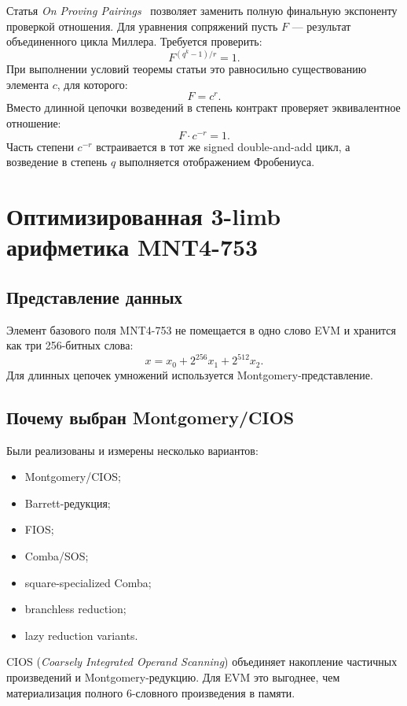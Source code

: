 \documentclass[12pt,a4paper]{article}
\begin{document}
Статья \emph{On Proving Pairings}~\cite{eprint640} позволяет заменить полную
финальную экспоненту проверкой отношения. Для уравнения сопряжений пусть $F$ ---
результат объединенного цикла Миллера. Требуется проверить:
\[
    F^{(q^k-1)/r}=1.
\]
При выполнении условий теоремы статьи это равносильно существованию элемента
$c$, для которого:
\[
    F=c^r.
\]
Вместо длинной цепочки возведений в степень контракт проверяет эквивалентное
отношение:
\[
    F\cdot c^{-r}=1.
\]
Часть степени $c^{-r}$ встраивается в тот же signed double-and-add цикл, а
возведение в степень $q$ выполняется отображением Фробениуса.

\section{Оптимизированная 3-limb арифметика MNT4-753}

\subsection{Представление данных}

Элемент базового поля MNT4-753 не помещается в одно слово EVM и хранится как
три 256-битных слова:
\[
    x=x_0+2^{256}x_1+2^{512}x_2.
\]
Для длинных цепочек умножений используется Montgomery-представление.

\subsection{Почему выбран Montgomery/CIOS}

Были реализованы и измерены несколько вариантов:
\begin{itemize}
    \item Montgomery/CIOS;
    \item Barrett-редукция;
    \item FIOS;
    \item Comba/SOS;
    \item square-specialized Comba;
    \item branchless reduction;
    \item lazy reduction variants.
\end{itemize}

CIOS (\emph{Coarsely Integrated Operand Scanning}) объединяет накопление
частичных произведений и Montgomery-редукцию. Для EVM это выгоднее, чем
материализация полного 6-словного произведения в памяти.
\end{document}
